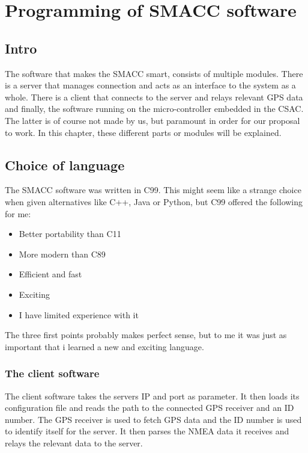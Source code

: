 \documentclass[12pt,english,a4paper]{report}
\begin{document}
\section{Programming of SMACC software}

\subsection{Intro}
The software that makes the SMACC smart, consists of multiple modules. There is a server that manages connection and acts as an interface to the system as a whole. There is a client that connects to the server and relays relevant GPS data and finally, the software running on the micro-controller embedded in the CSAC. The latter is of course not made by us, but paramount in order for our proposal to work. In this chapter, these different parts or modules will be explained.

\subsection{Choice of language}
The SMACC software was written in C99. This might seem like a strange choice when given alternatives like C++, Java or Python, but C99 offered the following for me:
\begin{itemize}
  \item Better portability than C11
  \item More modern than C89
  \item Efficient and fast
  \item Exciting
  \item I have limited experience with it
\end{itemize}
The three first points probably makes perfect sense, but to me it was just as important that i learned a new and exciting language. 

\subsubsection{The client software}
The client software takes the servers IP and port as parameter. It then loads its configuration file and reads the path to the connected GPS receiver and an ID number. The GPS receiver is used to fetch GPS data and the ID number is used to identify itself for the server. It then parses the NMEA data it receives and relays the relevant data to the server. 
\end{document}
